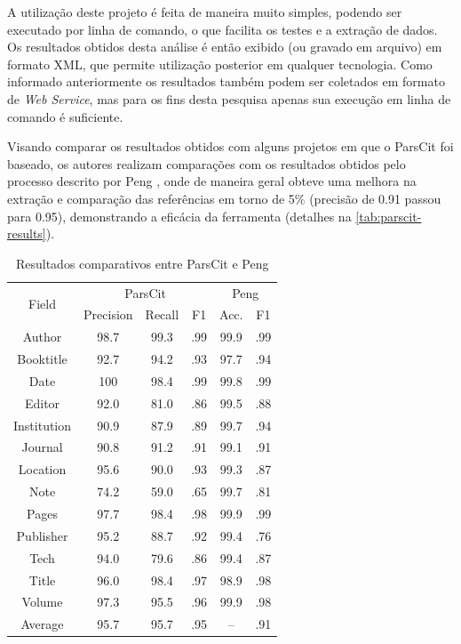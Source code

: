 A utilização deste projeto é feita de maneira muito simples, podendo ser executado por linha de comando, o que facilita os testes e a extração de dados. Os resultados obtidos desta análise é então exibido (ou gravado em arquivo) em formato XML, que permite utilização posterior em qualquer tecnologia. Como informado anteriormente os resultados também podem ser coletados em formato de \textit{Web Service}, mas para os fins desta pesquisa apenas sua execução em linha de comando é suficiente.

Visando comparar os resultados obtidos com alguns projetos em que o ParsCit foi baseado, os autores realizam comparações com os resultados obtidos pelo processo descrito por Peng \cite{Peng-CRF-IE}, onde de maneira geral obteve uma melhora na extração e comparação das referências em torno de 5\% (precisão de 0.91 passou para 0.95), demonstrando a eficácia da ferramenta (detalhes na \autoref{tab:parscit-results}).

\begin{table}
    \caption{Resultados comparativos entre ParsCit e Peng \cite{Peng-CRF-IE}}
    \begin{center}
        \begin{tabular}{|c|c|c|c|c|c|}
            \hline 
            \multirow{2}{*}{Field} & \multicolumn{3}{c|}{ParsCit} & \multicolumn{2}{c|}{Peng} \\
            \cline{2-6}
             & Precision & Recall & F1 & Acc. & F1 \\ 
            \hline
            Author & 98.7 & 99.3 & .99 & 99.9 & .99 \\
            Booktitle & 92.7 & 94.2 & .93 & 97.7 & .94 \\
            Date & 100 & 98.4 & .99 & 99.8 & .99 \\
            Editor & 92.0 & 81.0 & .86 & 99.5 & .88 \\
            Institution & 90.9 & 87.9 & .89 & 99.7 & .94 \\
            Journal & 90.8 & 91.2 & .91 & 99.1 & .91 \\
            Location & 95.6 & 90.0 & .93 & 99.3 & .87 \\
            Note & 74.2 & 59.0 & .65 & 99.7 & .81 \\
            Pages & 97.7 & 98.4 & .98 & 99.9 & .99  \\
            Publisher & 95.2 & 88.7 & .92 & 99.4 & .76 \\
            Tech & 94.0 & 79.6 & .86 & 99.4 & .87 \\
            Title & 96.0 & 98.4 & .97 & 98.9 & .98 \\
            Volume & 97.3 & 95.5 & .96 & 99.9 & .98 \\
            \hline
            Average & 95.7 & 95.7 & .95 & – & .91 \\
            \hline
        \end{tabular}
    \end{center}
    \label{tab:parscit-results}
\end{table}

